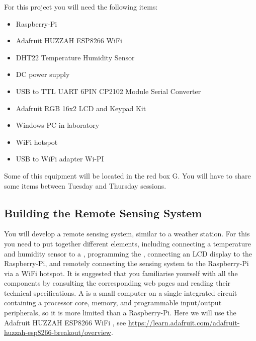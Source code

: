For this project you will need the following items:
\begin{itemize}
\item Raspberry-Pi
\item Adafruit HUZZAH ESP8266 WiFi  \microcontroller
\item DHT22 Temperature Humidity Sensor 
\item DC power supply
\item USB  to TTL UART 6PIN CP2102 Module Serial Converter
\item Adafruit RGB 16x2 LCD and Keypad Kit 
\item Windows PC in laboratory
\item WiFi hotspot 
\item USB to WiFi adapter Wi-PI
\end{itemize}
Some of this equipment will be located in the red box G. You will have to share some items between Tuesday and Thursday sessions. 


\subsection{Building the Remote Sensing System}

You will develop a remote sensing system, similar to a weather station.
For this you need to put together different elements, including 
connecting a temperature and humidity sensor to a \microcontroller, 
programming the \microcontroller,
connecting an LCD display to the Raspberry-Pi,
and remotely connecting the sensing system to the Raspberry-Pi via
a WiFi hotspot. It is suggested that you familiarise yourself with all the components
by consulting the corresponding web pages and reading their  technical specifications.
A \microcontroller is a small computer on a single integrated circuit containing a processor core, memory, and programmable input/output peripherals,  so it is more limited than a 
Raspberry-Pi. Here we will use the Adafruit HUZZAH ESP8266 WiFi  \microcontroller,
see \url{https://learn.adafruit.com/adafruit-huzzah-esp8266-breakout/overview}.

